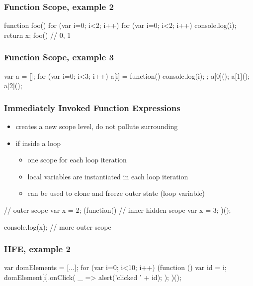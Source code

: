 \begin{frame}[fragile] \frametitle{Function Scope, example 2}

\begin{CodeBox}{}
function foo() {
  for (var i=0; i<2; i++) {
    for (var i=0; i<2; i++) {
      console.log(i);
    }
  }
  return x;
}
foo()  // 0, 1
\end{CodeBox}
\end{frame}

\begin{frame}[fragile] \frametitle{Function Scope, example 3}

\begin{CodeBox}{}
var a = [];
for (var i=0; i<3; i++) {
  a[i] = function() { console.log(i); };
}
a[0]();
a[1]();
a[2]();
\end{CodeBox}
\end{frame}

\begin{frame}[fragile] \frametitle{Immediately Invoked Function Expressions}
\begin{itemize}
  \item creates a new scope level, do not pollute surrounding
  \item if inside a loop
  \begin{itemize}
    \item one scope for each loop iteration
    \item local variables are instantiated in each loop iteration
    \item can be used to clone and freeze outer state (loop variable)
  \end{itemize}
\end{itemize}

\begin{CodeBox}{}
// outer scope
var x = 2;
(function() {
  // inner hidden scope
  var x = 3;
})();

console.log(x);
// more outer scope
\end{CodeBox}
\end{frame}

\begin{frame}[fragile] \frametitle{IIFE, example 2}

\begin{CodeBox}{}
var domElements = [...];
for (var i=0; i<10; i++) {
  (function () {
    var id = i;
    domElement[i].onClick(
      _ => { alert('clicked ' + id); }
    );
  })();  
}
\end{CodeBox}
\end{frame}

